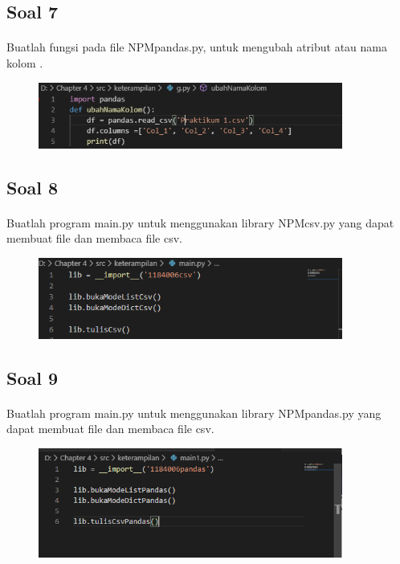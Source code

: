 \documentclass{article}
\begin{document}
    \newpage\subsection*{Soal 7}
        \paragraph{}Buatlah fungsi pada file NPMpandas.py, untuk mengubah atribut atau nama kolom .
        \begin{figure}[ht]
                \centerline{\includegraphics[width=10cm]{figure/g.PNG}}
            \end{figure}
    \subsection*{Soal 8}
        \paragraph{}Buatlah program main.py untuk menggunakan library NPMcsv.py yang dapat membuat file dan membaca file csv.
\begin{figure}[ht]
                \centerline{\includegraphics[width=10cm]{figure/i.PNG}}
            \end{figure}
        
    \subsection*{Soal 9}
        \paragraph{}Buatlah program main.py untuk menggunakan library NPMpandas.py yang dapat membuat file dan membaca file csv.
       \begin{figure}[ht]
            \centerline{\includegraphics[width=10cm]{figure/j.PNG}}
            \end{figure}
    
\end{document}
